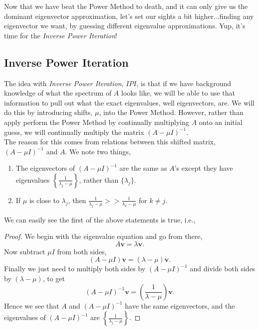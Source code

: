 \documentclass[paper=a4, fontsize=11pt]{scrartcl} %
\numberwithin{equation}{section} %
\numberwithin{figure}{section} %
\numberwithin{table}{section} %
\begin{document}
Now that we have beat the Power Method to death, and it can only give us the dominant eigenvector approximation, let's set our sights a bit higher$\ldots$finding any eigenvector we want, by guessing different eigenvalue approximations. Yup, it's time for the \emph{Inverse Power Iteration}!


%
%

\subsection{Inverse Power Iteration}

The idea with \emph{Inverse Power Iteration}, $IPI$, is that if we have background knowledge of what the spectrum of $A$ looks like, we will be able to use that information to pull out what the exact eigenvalues, well eigenvectors, are. We will do this by introducing shifts, $\mu$, into the Power Method. However, rather than apply perform the Power Method by continually multiplying $A$ onto an initial guess, we will continually multiply the matrix $(A-\mu I)^{-1}$.\\

The reason for this comes from relations between this shifted matrix, $(A-\mu I)^{-1}$ and $A$. We note two things, 
\begin{enumerate}
\item The eigenvectors of $(A-\mu I)^{-1}$  are the same as $A$'s except they have eigenvalues $\left\{ \frac{1}{\lambda_j-\mu } \right\}$, rather than $\{ \lambda_j \}$.
\item If $\mu$ is close to $\lambda_j$, then $\frac{1}{\lambda_j-\mu} >> \frac{1}{\lambda_k -\mu}$ for $k\neq j$.
\end{enumerate}

We can easily see the first of the above statements is true, i.e., 
\begin{proof}
We begin with the eigenvalue equation and go from there,
$$A\textbf{v} = \lambda \textbf{v}.$$
Now subtract $\mu I$ from both sides, 
$$(A-\mu I) \textbf{v} = (\lambda-\mu) \textbf{v}.$$
Finally we just need to multiply both sides by $(A-\mu I)^{-1}$ and divide both sides by $(\lambda-\mu)$, to get
$$(A-\mu I)^{-1} \textbf{v} = \left( \frac{1}{\lambda-\mu} \right) \textbf{v}.$$
Hence we see that $A$ and $(A-\mu I)^{-1}$ have the same eigenvectors, and the eigenvalues of $(A-\mu I)^{-1}$ are $\left\{ \frac{1}{\lambda_j-\mu } \right\}$.
\end{proof}
\end{document}
